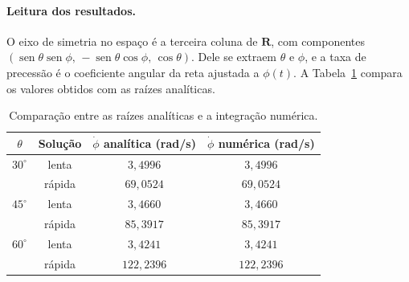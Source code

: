 \documentclass[11pt,a4paper]{article}
\newcommand{\vet}[1]{\mathbf{#1}}
\newcommand{\seno}{\operatorname{sen}}
\newcommand{\phid}{\dot{\phi}}
\begin{document}
\paragraph{Leitura dos resultados.} O eixo de simetria no espaço é a terceira coluna de $\vet{R}$, com componentes $(\seno\theta\seno\phi,\,-\seno\theta\cos\phi,\,\cos\theta)$. Dele se extraem $\theta$ e $\phi$, e a taxa de precessão é o coeficiente angular da reta ajustada a $\phi(t)$. A Tabela~\ref{m:tab:val} compara os valores obtidos com as raízes analíticas.

\begin{table}[H]
\centering\small
\caption{Comparação entre as raízes analíticas e a integração numérica.}
\label{m:tab:val}
\begin{tabular}{cccc}
\toprule
$\theta$ & Solução & $\phid$ analítica (rad/s) & $\phid$ numérica (rad/s)\\
\midrule
$30^\circ$ & lenta & $3,4996$ & $3,4996$\\
           & rápida & $69,0524$ & $69,0524$\\
$45^\circ$ & lenta & $3,4660$ & $3,4660$\\
           & rápida & $85,3917$ & $85,3917$\\
$60^\circ$ & lenta & $3,4241$ & $3,4241$\\
           & rápida & $122,2396$ & $122,2396$\\
\bottomrule
\end{tabular}
\end{table}
\end{document}
